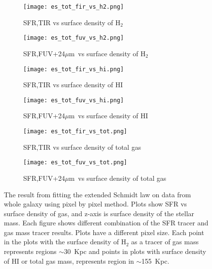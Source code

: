 \documentclass[useAMS,usenatbib]{mn2e}
\newcommand \um    {$\mu$m\ }
\begin{document}
\begin{figure*}
    \centering
    \begin{subfigure}[b]{0.3\textwidth}
        \centering
        \texttt{[image: es\_tot\_fir\_vs\_h2.png]}
        \caption{SFR,TIR vs surface density of H$_2$}
        \label{fig:es,all,fir,h2}
    \end{subfigure}
    \hfill
    \begin{subfigure}[b]{0.3\textwidth}
        \centering
        \texttt{[image: es\_tot\_fuv\_vs\_h2.png]}
        \caption{SFR,FUV+24\um vs surface density of H$_2$}
        \label{fig:es,all,fuv,h2}
    \end{subfigure}
    \hfill
    \begin{subfigure}[b]{0.3\textwidth}
        \texttt{[image: es\_tot\_fir\_vs\_hi.png]}
        \caption{SFR,TIR vs surface density of HI}
        \label{fig:es,all,fir,hi}
    \end{subfigure}
     \centering
    \begin{subfigure}[b]{0.3\textwidth}
        \centering
        \texttt{[image: es\_tot\_fuv\_vs\_hi.png]}
        \caption{SFR,FUV+24\um vs surface density of HI}
        \label{fig:es,all,fuv,hi}
    \end{subfigure}
    \hfill
    \begin{subfigure}[b]{0.3\textwidth}
        \centering
        \texttt{[image: es\_tot\_fir\_vs\_tot.png]}
        \caption{SFR,TIR vs surface density of total gas}
        \label{fig:es,all,fir,tot}
    \end{subfigure}
    \hfill
    \begin{subfigure}[b]{0.3\textwidth}
        \centering
        \texttt{[image: es\_tot\_fuv\_vs\_tot.png]}
        \caption{SFR,FUV+24\um vs surface density of total gas}
        \label{fig:es,all,fuv,tot}
    \end{subfigure}
    \caption{The result from fitting the extended Schmidt law on data from whole galaxy using pixel by pixel method. Plots show SFR vs surface density of gas, and z-axis is surface density of the stellar mass. Each figure shows different combination of the SFR tracer and gas mass tracer results. Plots have a different pixel size. Each point in the plots with the surface density of H$_2$ as a tracer of gas mass represents regions $\sim$30~Kpc and points in plots with surface density of HI or total gas mass, represents region in $\sim$155~Kpc.}
    \label{fig:es,all}
\end{figure*}
\end{document}
